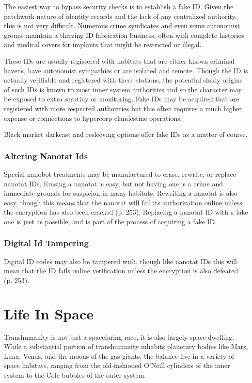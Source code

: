The easiest way to bypass security checks is to establish 
a fake ID. Given the patchwork nature of identity records
and the lack of any centralized authority, this is
not very difficult. Numerous crime syndicates and even 
some autonomist groups maintain a thriving ID fabrication
business, often with complete histories and medical
covers for implants that might be restricted or illegal. 

These IDs are usually registered with habitats that are 
either known criminal havens, have autonomist sympathies
or are isolated and remote. Though the ID is
actually verifiable and registered with these stations, the 
potential shady origins of such IDs is known to most 
inner system authorities and so the character may be 
exposed to extra scrutiny or monitoring. Fake IDs may 
be acquired that are registered with more respected authorities
but this often requires a much higher expense
or connections to hypercorp clandestine operations.

Black market darkcast and resleeving options offer 
fake IDs as a matter of course.

\subsubsection{Altering Nanotat Ids}

Special nanobot treatments may be manufactured 
to erase, rewrite, or replace nanotat IDs. Erasing a 
nanotat is easy, but not having one is a crime and immediate
grounds for suspicion in many habitats. Rewriting
a nanotat is also easy, though this means that
the nanotat will fail its authorization online unless the 
encryption has also been cracked (p. 253). Replacing 
a nanotat ID with a fake one is just as possible, and is 
part of the process of acquiring a fake ID.

\subsubsection{Digital Id Tampering}

Digital ID codes may also be tampered with, though like 
nanotat IDs this will mean that the ID fails online verification
unless the encryption is also defeated (p. 253).

\section{Life In Space}

Transhumanity is not just a spacefaring race, it is 
also largely space-dwelling. While a substantial portion
of transhumanity inhabits planetary bodies like
Mars, Luna, Venus, and the moons of the gas giants, 
the balance live in a variety of space habitats, ranging 
from the old-fashioned O'Neill cylinders of the inner 
system to the Cole bubbles of the outer system.

